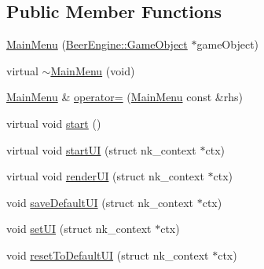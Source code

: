 \subsection*{Public Member Functions}
\begin{DoxyCompactItemize}
\item 
\mbox{\hyperlink{class_game_1_1_component_1_1_main_menu_a9c2d8ecb603add206dfbf649cec13d02}{Main\+Menu}} (\mbox{\hyperlink{class_beer_engine_1_1_game_object}{Beer\+Engine\+::\+Game\+Object}} $\ast$game\+Object)
\item 
virtual \mbox{\hyperlink{class_game_1_1_component_1_1_main_menu_a5a631866a68545d0a825453517d5e1c1}{$\sim$\+Main\+Menu}} (void)
\item 
\mbox{\hyperlink{class_game_1_1_component_1_1_main_menu}{Main\+Menu}} \& \mbox{\hyperlink{class_game_1_1_component_1_1_main_menu_ad8a5f072da38a95bdda3f9747cf6e1fa}{operator=}} (\mbox{\hyperlink{class_game_1_1_component_1_1_main_menu}{Main\+Menu}} const \&rhs)
\item 
virtual void \mbox{\hyperlink{class_game_1_1_component_1_1_main_menu_a9043ca6c0ead0ef5fc048ac84171b597}{start}} ()
\item 
virtual void \mbox{\hyperlink{class_game_1_1_component_1_1_main_menu_ae50614def462ca82eb6c4404ee82a82e}{start\+UI}} (struct nk\+\_\+context $\ast$ctx)
\item 
virtual void \mbox{\hyperlink{class_game_1_1_component_1_1_main_menu_a36f876bbeca9056e17c6d13b82fc3364}{render\+UI}} (struct nk\+\_\+context $\ast$ctx)
\item 
void \mbox{\hyperlink{class_game_1_1_component_1_1_main_menu_a8feea01a9e2b3e4a06efd810a2ef5464}{save\+Default\+UI}} (struct nk\+\_\+context $\ast$ctx)
\item 
void \mbox{\hyperlink{class_game_1_1_component_1_1_main_menu_a48c58d26af82bc24b8930b18f56fdc2f}{set\+UI}} (struct nk\+\_\+context $\ast$ctx)
\item 
void \mbox{\hyperlink{class_game_1_1_component_1_1_main_menu_aab4b543fd346e0f2e5953cc985692f9c}{reset\+To\+Default\+UI}} (struct nk\+\_\+context $\ast$ctx)
\end{DoxyCompactItemize}
